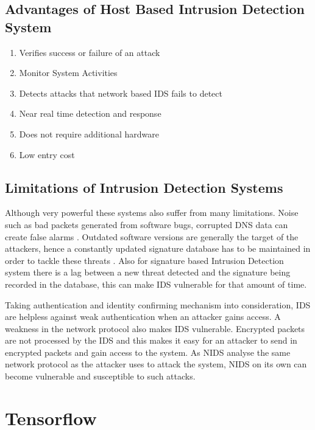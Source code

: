 \documentclass[12pt, a4paper]{report}
\begin{document}
\section{Advantages of Host Based Intrusion Detection System} \label{sec:advantagesHostBasedIDS}
\begin{enumerate}
	\item{Verifies success or failure of an attack}
	\item{Monitor System Activities}
	\item{Detects attacks that network based IDS fails to detect}
	\item{Near real time detection and response}
	\item{Does not require additional hardware}
	\item{Low entry cost}
\end{enumerate}


\section{Limitations of Intrusion Detection Systems}\label{sec:limitsofIDS}

Although very powerful these systems also suffer from many limitations. Noise such as bad packets generated from software bugs, corrupted DNS data can create false alarms \cite{securityengineering}. Outdated software versions are generally the target of the attackers, hence a constantly updated signature database has to be maintained in order to tackle these threats \cite{securityengineering}. Also for signature based Intrusion Detection system there is a lag between a new threat detected and the signature being recorded in the database, this can make IDS vulnerable for that amount of time. \\ \par

Taking authentication and identity confirming mechanism into consideration, IDS are helpless against weak authentication when an attacker gains access. A weakness in the network protocol also makes IDS vulnerable. Encrypted packets are not processed by the IDS and this makes it easy for an attacker to send in encrypted packets and gain access to the system. As NIDS analyse the same network protocol as the attacker uses to attack the system, NIDS on its own can become vulnerable and susceptible to such attacks. \cite{limitationOfIDS}
\clearpage



\chapter{Tensorflow}\label{sec:tensorflow}
\end{document}
